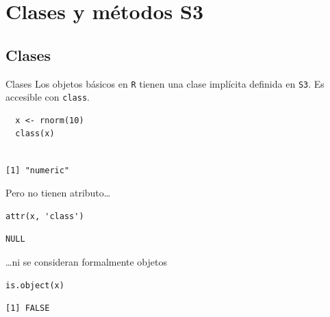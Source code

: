 \documentclass[xcolor={usenames,svgnames,dvipsnames}]{beamer}
\begin{document}
\section{Clases y métodos S3}
\label{sec:org1421532}

\subsection{Clases}
\label{sec:org3f71458}
\begin{frame}[label={sec:org6c23ed0},fragile]{Clases}
 Los objetos básicos en \texttt{R} tienen una clase implícita definida en \texttt{S3}. Es accesible con \texttt{class}.
\lstset{language=r,label= ,caption= ,captionpos=b,numbers=none}
\begin{lstlisting}
  x <- rnorm(10)
  class(x)
\end{lstlisting}

\begin{verbatim}

[1] "numeric"
\end{verbatim}


Pero no tienen atributo\ldots{}
\lstset{language=r,label= ,caption= ,captionpos=b,numbers=none}
\begin{lstlisting}
attr(x, 'class')
\end{lstlisting}

\begin{verbatim}
NULL
\end{verbatim}


\ldots{}ni se consideran formalmente objetos
\lstset{language=r,label= ,caption= ,captionpos=b,numbers=none}
\begin{lstlisting}
is.object(x)
\end{lstlisting}

\begin{verbatim}
[1] FALSE
\end{verbatim}
\end{frame}
\end{document}
